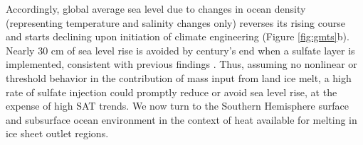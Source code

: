 \documentclass[draft,grl]{AGUTeX}  %
\begin{document}
\begin{article}
Accordingly, global average sea level due to changes in ocean density (representing temperature and salinity changes only) reverses its rising course and starts declining upon initiation of climate engineering (Figure \ref{fig:gmts}b). Nearly 30 cm of sea level rise is avoided by century's end when a sulfate layer is implemented, consistent with previous findings \citep{irvine12}. Thus, assuming no nonlinear or threshold behavior in the contribution of mass input from land ice melt, a high rate of sulfate injection could promptly reduce or avoid sea level rise, at the expense of high SAT trends. We now turn to the Southern Hemisphere surface and subsurface ocean environment in the context of heat available for melting in ice sheet outlet regions.  %


\end{article}
\end{document}
